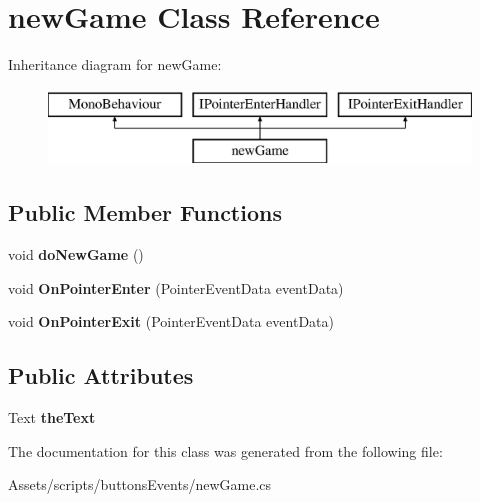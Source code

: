 \hypertarget{classnew_game}{}\section{new\+Game Class Reference}
\label{classnew_game}
Inheritance diagram for new\+Game\+:\begin{figure}[H]
\begin{center}
\leavevmode
\includegraphics[height=2.000000cm]{classnew_game}
\end{center}
\end{figure}
\subsection*{Public Member Functions}
\begin{DoxyCompactItemize}
\item 
\mbox{\label{classnew_game_aebb08e969bc2002ae3e165d6f0e1cf44}} 
void {\bfseries do\+New\+Game} ()
\item 
\mbox{\label{classnew_game_a7684688306cb3bb07211cd05ad7c5998}} 
void {\bfseries On\+Pointer\+Enter} (Pointer\+Event\+Data event\+Data)
\item 
\mbox{\label{classnew_game_a7de0e1b4973147e251978f249d1c5472}} 
void {\bfseries On\+Pointer\+Exit} (Pointer\+Event\+Data event\+Data)
\end{DoxyCompactItemize}
\subsection*{Public Attributes}
\begin{DoxyCompactItemize}
\item 
\mbox{\label{classnew_game_ae7bc82e056f0743b29789ee1235e0ba7}} 
Text {\bfseries the\+Text}
\end{DoxyCompactItemize}


The documentation for this class was generated from the following file\+:\begin{DoxyCompactItemize}
\item 
Assets/scripts/buttons\+Events/new\+Game.\+cs\end{DoxyCompactItemize}
